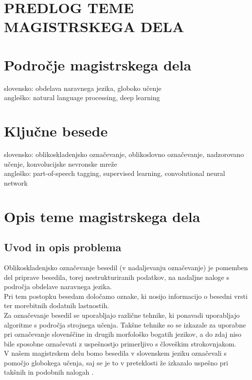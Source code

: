 \documentclass[a4paper, 12pt]{article}
\begin{document}
\clearpage
\section*{PREDLOG TEME MAGISTRSKEGA DELA}

\section{Področje magistrskega dela}

slovensko: obdelava naravnega jezika, globoko učenje\\
angleško: natural language processing, deep learning


\section{Ključne besede}

slovensko: oblikoskladenjsko označevanje, oblikoslovno označevanje, nadzorovano učenje, konvolucijske nevronske mreže\\
angleško: part-of-speech tagging, supervised learning, convolutional neural network


\section{Opis teme magistrskega dela}

\subsection{Uvod in opis problema}

Oblikoskladenjsko označevanje besedil (v nadaljevanju označevanje) je pomemben del priprave besedila, torej nestrukturiranih podatkov, na nadaljne naloge s področja obdelave naravnega jezika.\\
Pri tem postopku besedam določamo oznake, ki nosijo informacijo o besedni vrsti ter morebitnih dodatnih lastnostih. \\
Za označevanje besedil se uporabljajo različne tehnike, ki ponavadi uporabljajo algoritme s področja strojnega učenja. Takšne tehnike so se izkazale za uporabne pri označevanje slovenščine in drugih morfološko bogatih jezikov, a do zdaj niso bile sposobne označevati z uspešnostjo primerljivo s človeškim strokovnjakom.\\
V našem magistrskem delu bomo besedila v slovenskem jeziku označevali s pomočjo globokega učenja, saj se je to v preteklosti že izkazalo uspešno pri takšnih in podobnih nalogah \cite{Santos2014,Labeau2015}.
\end{document}
